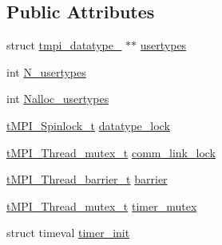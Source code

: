 \subsection*{\-Public \-Attributes}
\begin{DoxyCompactItemize}
\item 
struct \hyperlink{structtmpi__datatype__}{tmpi\-\_\-datatype\-\_\-} $\ast$$\ast$ \hyperlink{structtmpi__global_a282a8fd29f9e145538c93a221bb59b21}{usertypes}
\item 
int \hyperlink{structtmpi__global_aa1af1363f278ac6bf1949fd00b746db0}{\-N\-\_\-usertypes}
\item 
int \hyperlink{structtmpi__global_a168ef67ef1fd74a00426ad258dbbaf81}{\-Nalloc\-\_\-usertypes}
\item 
\hyperlink{structtMPI__Spinlock__t}{t\-M\-P\-I\-\_\-\-Spinlock\-\_\-t} \hyperlink{structtmpi__global_a414289338d904999e273cedaa4bde686}{datatype\-\_\-lock}
\item 
\hyperlink{structtMPI__Thread__mutex__t}{t\-M\-P\-I\-\_\-\-Thread\-\_\-mutex\-\_\-t} \hyperlink{structtmpi__global_a679238e0a4b27377b50fa7124d5ed84f}{comm\-\_\-link\-\_\-lock}
\item 
\hyperlink{structtMPI__Thread__barrier__t}{t\-M\-P\-I\-\_\-\-Thread\-\_\-barrier\-\_\-t} \hyperlink{structtmpi__global_ad9ce54c60df8b39d2f213cec745b05fe}{barrier}
\item 
\hyperlink{structtMPI__Thread__mutex__t}{t\-M\-P\-I\-\_\-\-Thread\-\_\-mutex\-\_\-t} \hyperlink{structtmpi__global_aef9b073f8c227fb05272516bf91ab694}{timer\-\_\-mutex}
\item 
struct timeval \hyperlink{structtmpi__global_aee4e65ed581d88344707e4501951ec25}{timer\-\_\-init}
\end{DoxyCompactItemize}


